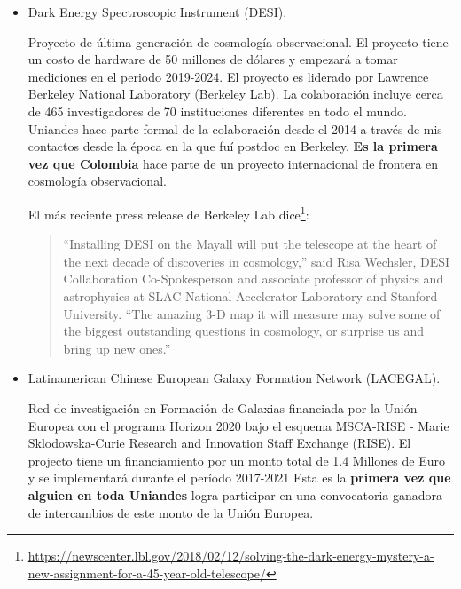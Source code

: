 \documentclass{article}
\begin{document}
\begin{itemize}

\item Dark Energy Spectroscopic Instrument (DESI).

Proyecto de \'ultima generaci\'on de cosmolog\'ia observacional.
El proyecto tiene un costo de hardware de 50 millones de d\'olares y
empezar\'a a tomar mediciones en el periodo 2019-2024.
El proyecto es liderado por Lawrence Berkeley National Laboratory
(Berkeley Lab). 
La colaboraci\'on incluye cerca de 465 investigadores de 70
instituciones diferentes en todo el mundo.
Uniandes hace parte formal de la colaboraci\'on desde el 2014 a
trav\'es de mis contactos desde la \'epoca en la que fu\'i postdoc en
Berkeley. 
{\bf Es la primera vez que Colombia} hace parte de un proyecto internacional
de frontera en cosmolog\'ia observacional.


El m\'as reciente press release de Berkeley Lab
dice\footnote{\url{https://newscenter.lbl.gov/2018/02/12/solving-the-dark-energy-mystery-a-new-assignment-for-a-45-year-old-telescope/}}: 
\begin{quote}
“Installing DESI on the Mayall will put the telescope at the heart of
  the next decade of discoveries in cosmology,” said Risa Wechsler,
  DESI Collaboration Co-Spokesperson and associate professor of
  physics and astrophysics at SLAC National Accelerator Laboratory and
  Stanford University. “The amazing 3-D map it will measure may solve
  some of the biggest outstanding questions in cosmology, or surprise
  us and bring up new ones.” 
\end{quote}


\item Latinamerican Chinese European Galaxy Formation Network
  (LACEGAL). 

Red de investigaci\'on en Formaci\'on de Galaxias financiada por la
Uni\'on Europea con el programa Horizon 2020 bajo el esquema MSCA-RISE - Marie
Sklodowska-Curie Research and Innovation Staff Exchange (RISE). El
projecto tiene un financiamiento por un monto total de 1.4 Millones de
Euro y se implementar\'a durante el per\'iodo 2017-2021 
Esta es la {\bf primera vez que alguien en toda Uniandes} logra
participar en una convocatoria ganadora de intercambios de este monto
de la Uni\'on Europea.


\end{itemize}
\end{document}
